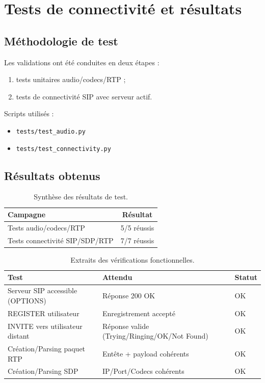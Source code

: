 \documentclass[12pt,a4paper]{article}
\begin{document}
\section{Tests de connectivité et résultats}

\subsection{Méthodologie de test}

Les validations ont été conduites en deux étapes :
\begin{enumerate}[leftmargin=1.2cm]
    \item tests unitaires audio/codecs/RTP ;
    \item tests de connectivité SIP avec serveur actif.
\end{enumerate}

Scripts utilisés :
\begin{itemize}[leftmargin=1.2cm]
    \item \texttt{tests/test\_audio.py}
    \item \texttt{tests/test\_connectivity.py}
\end{itemize}

\subsection{Résultats obtenus}

\begin{table}[H]
\centering
\begin{tabular}{p{8cm}c}
\toprule
\textbf{Campagne} & \textbf{Résultat} \\
\midrule
Tests audio/codecs/RTP & 5/5 réussis \\
Tests connectivité SIP/SDP/RTP & 7/7 réussis \\
\bottomrule
\end{tabular}
\caption{Synthèse des résultats de test.}
\end{table}

\begin{table}[H]
\centering
\begin{tabular}{p{7cm}p{4cm}p{3cm}}
\toprule
\textbf{Test} & \textbf{Attendu} & \textbf{Statut} \\
\midrule
Serveur SIP accessible (OPTIONS) & Réponse 200 OK & OK \\
REGISTER utilisateur & Enregistrement accepté & OK \\
INVITE vers utilisateur distant & Réponse valide (Trying/Ringing/OK/Not Found) & OK \\
Création/Parsing paquet RTP & Entête + payload cohérents & OK \\
Création/Parsing SDP & IP/Port/Codecs cohérents & OK \\
\bottomrule
\end{tabular}
\caption{Extraits des vérifications fonctionnelles.}
\end{table}
\end{document}
